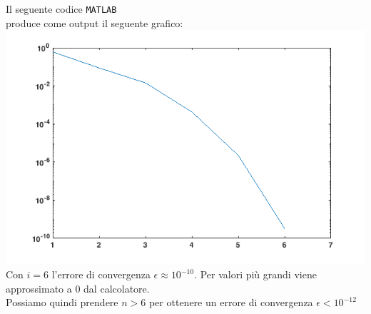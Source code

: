 Il seguente codice \texttt{MATLAB}\\

produce come output il seguente grafico:\\
\includegraphics[scale=0.7]{cap_1/es6/es6.png}\\
Con $i=6$ l'errore di convergenza $\epsilon \approx 10^{-10}$.
Per valori più grandi viene approssimato a 0 dal calcolatore.\\
Possiamo quindi prendere $n>6$ per ottenere un errore di convergenza $\epsilon < 10^{-12}$
